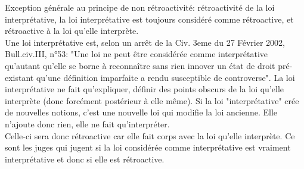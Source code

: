 Exception générale au principe de non rétroactivité: rétroactivité de la loi interprétative, la loi interprétative est toujours considéré comme rétroactive, et rétroactive à la loi qu'elle interprète. \\
Une loi interprétative est, selon un arrêt de la Civ. 3eme du 27 Février 2002, Bull.civ.III, n°53: "Une loi ne peut être considérée comme interprétative qu'autant qu'elle se borne à reconnaître sans rien innover un état de droit pré-existant qu'une définition imparfaite a rendu susceptible de controverse". La loi interprétative ne fait qu'expliquer, définir des points obscurs de la loi qu'elle interprète (donc forcément postérieur à elle même). Si la loi "interprétative" crée de nouvelles notions, c'est une nouvelle loi qui modifie la loi ancienne. Elle n'ajoute donc rien, elle ne fait qu'interpréter. \\
Celle-ci sera donc rétroactive car elle fait corps avec la loi qu'elle interprète. Ce sont les juges qui jugent si la loi considérée comme interprétative est vraiment interprétative et donc si elle est rétroactive.

